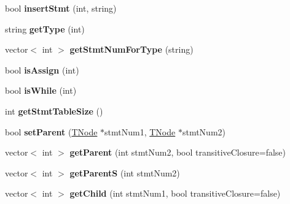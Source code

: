 \begin{DoxyCompactItemize}
\item 
\hypertarget{class_p_k_b_ad25761f60476280fdec6823a3dd86ca3}{}bool {\bfseries insert\+Stmt} (int, string)\label{class_p_k_b_ad25761f60476280fdec6823a3dd86ca3}

\item 
\hypertarget{class_p_k_b_a27b7b2b9de7323cc6091346266232498}{}string {\bfseries get\+Type} (int)\label{class_p_k_b_a27b7b2b9de7323cc6091346266232498}

\item 
\hypertarget{class_p_k_b_a4eb8a4274e37e898510024b03e45be3f}{}vector$<$ int $>$ {\bfseries get\+Stmt\+Num\+For\+Type} (string)\label{class_p_k_b_a4eb8a4274e37e898510024b03e45be3f}

\item 
\hypertarget{class_p_k_b_af4e86d4a594bb5bf6c93e8eed5d20c23}{}bool {\bfseries is\+Assign} (int)\label{class_p_k_b_af4e86d4a594bb5bf6c93e8eed5d20c23}

\item 
\hypertarget{class_p_k_b_a648f7fead9e8db61831d60eccd28a57f}{}bool {\bfseries is\+While} (int)\label{class_p_k_b_a648f7fead9e8db61831d60eccd28a57f}

\item 
\hypertarget{class_p_k_b_ab570be45efa7bf5cc83c2ed8708c25de}{}int {\bfseries get\+Stmt\+Table\+Size} ()\label{class_p_k_b_ab570be45efa7bf5cc83c2ed8708c25de}

\item 
\hypertarget{class_p_k_b_a7948dec07e7b413b6940b9fefc06969a}{}bool {\bfseries set\+Parent} (\hyperlink{class_t_node}{T\+Node} $\ast$stmt\+Num1, \hyperlink{class_t_node}{T\+Node} $\ast$stmt\+Num2)\label{class_p_k_b_a7948dec07e7b413b6940b9fefc06969a}

\item 
\hypertarget{class_p_k_b_a4358e4d65d46f2eea2ae0a6349ed39aa}{}vector$<$ int $>$ {\bfseries get\+Parent} (int stmt\+Num2, bool transitive\+Closure=false)\label{class_p_k_b_a4358e4d65d46f2eea2ae0a6349ed39aa}

\item 
\hypertarget{class_p_k_b_a0395c724a3d4059910d6944fb04b33d7}{}vector$<$ int $>$ {\bfseries get\+Parent\+S} (int stmt\+Num2)\label{class_p_k_b_a0395c724a3d4059910d6944fb04b33d7}

\item 
\hypertarget{class_p_k_b_aab801de5e6f32d627bbd0e95c482e82e}{}vector$<$ int $>$ {\bfseries get\+Child} (int stmt\+Num1, bool transitive\+Closure=false)\label{class_p_k_b_aab801de5e6f32d627bbd0e95c482e82e}


\end{DoxyCompactItemize}
